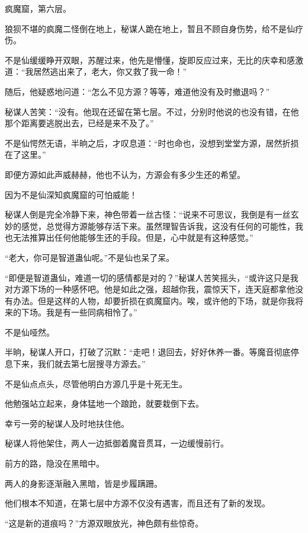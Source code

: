 
\begin{this_body}

疯魔窟，第六层。

狼狈不堪的疯魔二怪倒在地上，秘谋人跪在地上，暂且不顾自身伤势，给不是仙疗伤。

不是仙缓缓睁开双眼，苏醒过来，他先是懵懂，旋即反应过来，无比的庆幸和感激道：“我居然逃出来了，老大，你又救了我一命！”

随后，他疑惑地问道：“怎么不见方源？等等，难道他没有及时撤退吗？”

秘谋人苦笑：“没有。他现在还留在第七层。不过，分别时他说的也没有错，在他那个距离要逃脱出去，已经是来不及了。”

不是仙愕然无语，半晌之后，才叹息道：“时也命也，没想到堂堂方源，居然折损在了这里。”

即便方源如此声威赫赫，他也不认为，方源会有多少生还的希望。

因为不是仙深知疯魔窟的可怕威能！

秘谋人倒是完全冷静下来，神色带着一丝古怪：“说来不可思议，我倒是有一丝玄妙的感觉，总觉得方源能够存活下来。虽然理智告诉我，这没有任何的可能性，我也无法推算出任何他能够生还的手段。但是，心中就是有这种感觉。”

“老大，你可是智道蛊仙呢。”不是仙也呆了呆。

“即便是智道蛊仙，难道一切的感情都是对的？”秘谋人苦笑摇头，“或许这只是我对方源下场的一种感怀吧。他是如此之强，超越你我，震惊天下，连天庭都拿他没有办法。但是这样的人物，却要折损在疯魔窟内。唉，或许他的下场，就是你我将来的下场。我是有一些同病相怜了。”

不是仙哑然。

半晌，秘谋人开口，打破了沉默：“走吧！退回去，好好休养一番。等魔音彻底停息下来，我们就去第七层搜寻方源去。”

不是仙点点头，尽管他明白方源几乎是十死无生。

他勉强站立起来，身体猛地一个踉跄，就要栽倒下去。

幸亏一旁的秘谋人及时地扶住他。

秘谋人将他架住，两人一边抵御着魔音贯耳，一边缓慢前行。

前方的路，隐没在黑暗中。

两人的身影逐渐融入黑暗，皆是步履蹒跚。

他们根本不知道，在第七层中方源不仅没有遇害，而且还有了新的发现。

“这是新的道痕吗？”方源双眼放光，神色颇有些惊奇。


\end{this_body}
